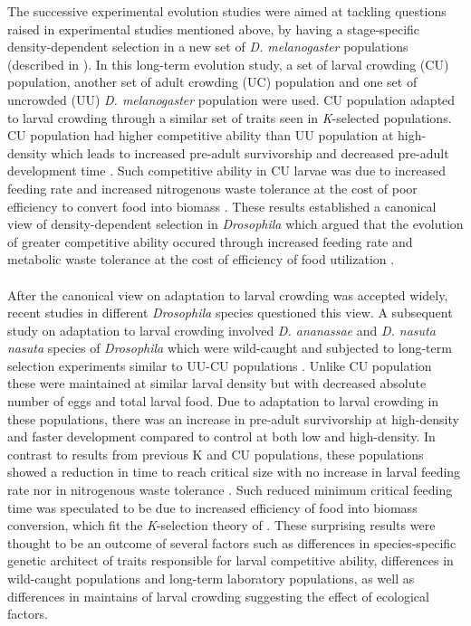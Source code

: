 The successive experimental evolution studies were aimed at tackling questions raised in experimental studies mentioned above, by having a stage-specific density-dependent selection in a new set of \textit{D. melanogaster} populations (described in \cite{joshiDirectionalStabilizingDensityDependent1993}). In this long-term evolution study, a set of larval crowding (CU) population, another set of adult crowding (UC) population and one set of uncrowded (UU) \textit{D. melanogaster} population were used. CU population adapted to larval crowding through a similar set of traits seen in \textit{K}-selected populations. CU population had higher competitive ability than UU population at high-density which leads to increased pre-adult survivorship and decreased pre-adult development time \citep{borashPatternsSelectionStress2001,joshiDirectionalStabilizingDensityDependent1993,santosDensityDependentNaturalSelection1997}. Such competitive ability in CU larvae was due to increased feeding rate and increased nitrogenous waste tolerance at the cost of poor efficiency to convert food into biomass \citep{borashGeneticPolymorphismMaintained1998,joshiDensitydependentNaturalSelection1996,shiotsuguSymmetryCorrelatedSelection1997}. These results established a canonical view of density-dependent selection in \textit{Drosophila} which argued that the evolution of greater competitive ability occured through increased feeding rate and metabolic waste tolerance at the cost of efficiency of food utilization \citep{joshiKselectionAselectionEffectiveness2001}. \\\\
After the canonical view on adaptation to larval crowding was accepted widely, recent studies in different \textit{Drosophila} species questioned this view. A subsequent study on adaptation to larval crowding involved \textit{D. ananassae} and \textit{D. nasuta nasuta} species of \textit{Drosophila} which were wild-caught and subjected to long-term selection experiments similar to UU-CU populations \citep{nagarajanAdaptationLarvalCrowding2016}. Unlike CU population these were maintained at similar larval density but with decreased absolute number of eggs and total larval food. Due to adaptation to larval crowding in these populations, there was an increase in pre-adult survivorship at high-density and faster development compared to control at both low and high-density. In contrast to results from previous K and CU populations, these populations showed a reduction in time to reach critical size with no increase in larval feeding rate nor in nitrogenous waste tolerance \citep{nagarajanAdaptationLarvalCrowding2016}. Such reduced minimum critical feeding time was speculated to be due to increased efficiency of food into biomass conversion, which fit the \textit{K}-selection theory of \citet*{macarthurTheoryIslandBiogeography1967}. These surprising results were thought to be an outcome of several factors such as differences in species-specific genetic architect of traits responsible for larval competitive ability, differences in wild-caught populations and long-term laboratory populations, as well as differences in maintains of larval crowding suggesting the effect of ecological factors.\\\\
